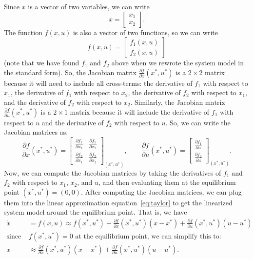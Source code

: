 \documentclass{ee122_notes}
\begin{document}
Since $x$ is a vector of two variables, we can write 
\[x = \begin{bmatrix}x_1 \\ x_2\end{bmatrix}.\]
The function $f(x,u)$ is also a vector of two functions, so we can write \[f(x,u) = \begin{bmatrix}f_1(x,u) \\ f_2(x,u)\end{bmatrix}\] (note that we have found $f_1$ and $f_2$ above when we rewrote the system model in the standard form). So, the Jacobian matrix $\frac{\partial f}{\partial x}(x^*, u^*)$ is a $2 \times 2$ matrix because it will need to include all cross-terms: the derivative of $f_1$ with respect to $x_1$, the derivative of $f_1$ with respect to $x_2$, the derivative of $f_2$ with respect to $x_1$, and the derivative of $f_2$ with respect to $x_2$. Similarly, the Jacobian matrix $\frac{\partial f}{\partial u}(x^*, u^*)$ is a $2 \times 1$ matrix because it will include the derivative of $f_1$ with respect to $u$ and the derivative of $f_2$ with respect to $u$. So, we can write the Jacobian matrices as:
\[
\frac{\partial f}{\partial x}(x^*, u^*) =
\begin{bmatrix}
\frac{\partial f_1}{\partial x_1} & \frac{\partial f_1}{\partial x_2}\\[1ex]
\frac{\partial f_2}{\partial x_1} & \frac{\partial f_2}{\partial x_2}
\end{bmatrix}_{(x^*, u^*)},
\qquad
\frac{\partial f}{\partial u}(x^*, u^*) =
\begin{bmatrix}
\frac{\partial f_1}{\partial u}\\[1ex]
\frac{\partial f_2}{\partial u}
\end{bmatrix}_{(x^*, u^*)}.
\]
Now, we can compute the Jacobian matrices by taking the derivatives of $f_1$ and $f_2$ with respect to $x_1$, $x_2$, and $u$, and then evaluating them at the equilibrium point $(x^*, u^*) = (0,0)$. After computing the Jacobian matrices, we can plug them into the linear approximation equation~\eqref{eq:taylor} to get the linearized system model around the equilibrium point. That is, we have
\begin{align*}
\dot x &= f(x, u) \approx f(x^*, u^*) + \frac{\partial f}{\partial x}(x^*, u^*)(x - x^*) + \frac{\partial f}{\partial u}(x^*, u^*)(u - u^*) \\
\text{since } &f(x^*, u^*) = 0 \text{ at the equilibrium point, we can simplify this to:}\\
\dot x &\approx \frac{\partial f}{\partial x}(x^*, u^*) (x -x^*) + \frac{\partial f}{\partial u}(x^*, u^*) (u - u^*).
\end{align*}
\end{document}
